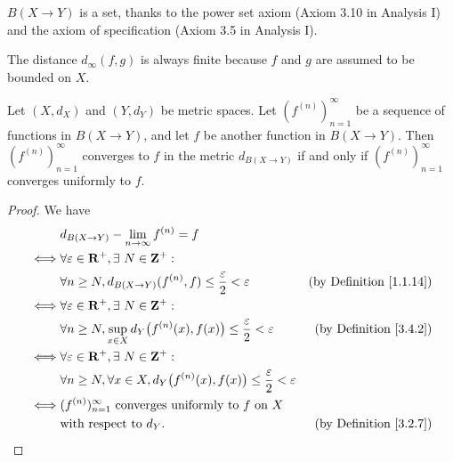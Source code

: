 \begin{note}
    \(B(X \to Y)\) is a set, thanks to the power set axiom (Axiom 3.10 in Analysis I) and the axiom of specification (Axiom 3.5 in Analysis I).
\end{note}

\begin{note}
    The distance \(d_\infty(f, g)\) is always finite because \(f\) and \(g\) are assumed to be bounded on \(X\).
\end{note}

\setcounter{theorem}{3}
\begin{proposition}\label{3.4.4}
    Let \((X, d_X)\) and \((Y, d_Y)\) be metric spaces.
    Let \((f^{(n)})_{n = 1}^\infty\) be a sequence of functions in \(B(X \to Y)\), and let \(f\) be another function in \(B(X \to Y)\).
    Then \((f^{(n)})_{n = 1}^\infty\) converges to \(f\) in the metric \(d_{B(X \to Y)}\) if and only if \((f^{(n)})_{n = 1}^\infty\) converges uniformly to \(f\).
\end{proposition}

\begin{proof}
    We have
    \begin{align*}
             & d_{B(X \to Y)} - \lim_{n \to \infty} f^{(n)} = f                                                                                                \\
        \iff & \forall \varepsilon \in \mathbf{R}^+, \exists\ N \in \mathbf{Z}^+ :                                                                                             \\
             & \forall n \geq N, d_{B(X \to Y)}(f^{(n)}, f) \leq \frac{\varepsilon}{2} < \varepsilon                     & \text{(by Definition \ref{1.1.14})} \\
        \iff & \forall \varepsilon \in \mathbf{R}^+, \exists\ N \in \mathbf{Z}^+ :                                                                                             \\
             & \forall n \geq N, \sup_{x \in X} d_Y\big(f^{(n)}(x), f(x)\big) \leq \frac{\varepsilon}{2} < \varepsilon   & \text{(by Definition \ref{3.4.2})}  \\
        \iff & \forall \varepsilon \in \mathbf{R}^+, \exists\ N \in \mathbf{Z}^+ :                                                                                             \\
             & \forall n \geq N, \forall x \in X, d_Y\big(f^{(n)}(x), f(x)\big) \leq \frac{\varepsilon}{2} < \varepsilon                                       \\
        \iff & (f^{(n)})_{n = 1}^\infty \text{ converges uniformly to } f \text{ on } X                                                                        \\
             & \text{with respect to } d_Y.                                                                              & \text{(by Definition \ref{3.2.7})}
    \end{align*}
\end{proof}

